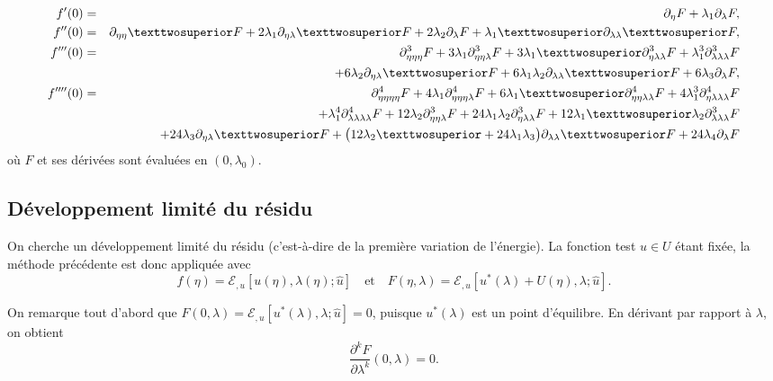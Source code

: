 \documentclass[12pt, final]{amsart}
\begin{document}
\begin{eqnarray}
  \label{eq:20220107060454}
  f'(0)&=&\partial _\eta  F+\lambda _1\partial _\lambda  F,\\
  \label{eq:20220107124311}
  f''(0)&=&\partial _{\eta \eta }²F+2\lambda _1\partial _{\eta \lambda }²F+2\lambda _2\partial _\lambda  F+\lambda _1²\partial _{\lambda \lambda }²F,\\
  \notag
  f'''(0)&=&\partial _{\eta \eta \eta }^3F+3\lambda _1\partial _{\eta \eta \lambda }^3F+3\lambda _1²\partial _{\eta \lambda \lambda }^3F+\lambda _1^3\partial _{\lambda \lambda \lambda }^3F\\
  \label{eq:20220107060500}
       &&+6\lambda _2\partial _{\eta \lambda }²F+6\lambda _1\lambda _2\partial _{\lambda \lambda }²F+6\lambda _3\partial _\lambda F,\\
  \notag
  f''''(0)&=&\partial _{\eta \eta \eta \eta }^4F+4\lambda _1\partial _{\eta \eta \eta \lambda }^4F+6\lambda _1²\partial _{\eta \eta \lambda \lambda }^4F+4\lambda _1^3\partial _{\eta \lambda \lambda \lambda }^4F\\
  \notag
       &&+\lambda _1^4\partial _{\lambda \lambda \lambda \lambda }^4F+12\lambda _2\partial _{\eta \eta \lambda }^3F+24\lambda _1\lambda _2\partial _{\eta \lambda \lambda }^3F+12\lambda _1²\lambda _2\partial _{\lambda \lambda \lambda }^3F\\
       &&+24\lambda _3\partial _{\eta \lambda }²F+\bigl(12\lambda _2²+24\lambda _1\lambda _3\bigr)\partial _{\lambda \lambda }²F+24\lambda _4\partial _\lambda F
\end{eqnarray}
où \(F\) et ses dérivées sont évaluées en \((0, \lambda _0)\).

\subsection{Développement limité du résidu}
\label{sec:20211112182000}

On cherche un développement limité du résidu (c'est-à-dire de la première
variation de l'énergie). La fonction test \(\hat{u}\in U\) étant fixée, la
méthode précédente est donc appliquée avec
\begin{equation}
  \label{eq:20220107054629}
  f(\eta )=\mathcal E_{,u}[u(\eta ), \lambda (\eta );\hat{u}]
  \quad\text{et}\quad
  F(\eta , \lambda )=\mathcal E_{,u}[u^*(\lambda )+U(\eta ), \lambda ; \hat{u}].
\end{equation}

On remarque tout d'abord que \(F(0, \lambda )=\mathcal E_{,u}[u^*(\lambda ), \lambda ; \hat{u}]=0\), puisque
\(u^*(\lambda )\) est un point d'équilibre. En dérivant par rapport à \(\lambda \), on obtient
\begin{equation}
  \label{eq:20211112164240}
  \frac{\partial ^kF}{\partial \lambda ^k}(0, \lambda )=0.
\end{equation}
\end{document}

